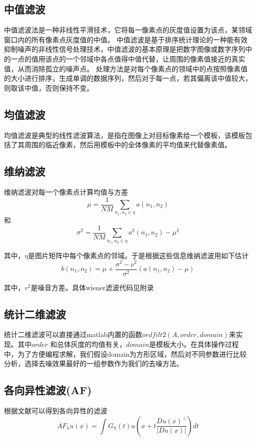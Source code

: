 \documentclass[a4paper,left=2.5cm,right=2.5cm]{article}
\begin{document}
\begin{spacing}{1.6}
		\subsection{中值滤波}
		中值滤波法是一种非线性平滑技术，它将每一像素点的灰度值设置为该点，某领域窗口内的所有像素点灰度值的中值。
		中值滤波是基于排序统计理论的一种能有效抑制噪声的非线性信号处理技术，中值滤波的基本原理是把数字图像或数字序列中的一点的值用该点的一个邻域中各点值得中值代替，让周围的像素值接近的真实值，从而消除孤立的噪声点。
		处理方法是对每个像素点的领域中的点按照像素值的大小进行排序，生成单调的数据序列，然后对于每一点，若其偏离该中值较大，则取该中值，否则保持不变。
		\subsection{均值滤波}
		均值滤波是典型的线性滤波算法，是指在图像上对目标像素给一个模板，该模板包括了其周围的临近像素，然后用模板中的全体像素的平均值来代替像素值。
		\subsection{维纳滤波}
		维纳滤波对每一个像素点计算均值与方差
		\begin{equation}
		\mu = \frac{1}{NM}\sum\limits_{n_1,n_2\in \eta }a(n_1,n_2)
		\end{equation}
		和
		\begin{equation}
		\sigma^2 = \frac{1}{NM}\sum\limits_{n_1,n_2\in \eta }a^2(n_1,n_2)-\mu^2
		\end{equation}
		
		其中，$\eta$是图片矩阵中每个像素点的邻域。于是根据这些信息维纳滤波用如下估计
		\begin{equation}
		b(n_1,n_2) = \mu + \frac{\sigma^2 - \nu^2}{\sigma^2}(a(n_1,n_2)-\mu)
		\end{equation}
		
		其中，$v^2$是噪音方差。具体wiener滤波代码见附录
		\subsection{统计二维滤波}
		统计二维滤波可以直接通过matlab内置的函数$ordfilt2(A,order,domain)$来实现。其中$order$ 和总体灰度的均值有关，$domain$是模板大小。在具体操作过程中，为了方便编程求解，我们假设domain为方形区域，然后对不同参数进行比较分析，选择去噪效果最好的一组参数作为我们的去噪方法。
		\subsection{各向异性滤波(AF)}
		根据文献\cite{hal}可以得到各向异性的滤波
		\begin{equation}
		AF_hu(x) = \int G_h(t)u(x+t\frac{Du(x)^{\bot}}{|Du(x)|})dt
		\end{equation}
		

\end{spacing}
\end{document}
